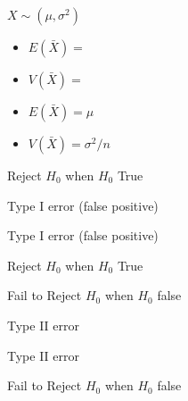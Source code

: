 \documentclass[12pt]{article}
\begin{document}
\begin{note}
    \begin{field}
        $X \sim (\mu,\sigma^2)$
            \begin{itemize}
              \item $E(\bar{X}) = $
              \item $V(\bar{X}) = $
            \end{itemize}
    \end{field}
    \begin{field}
        \begin{itemize}
              \item $E(\bar{X}) = \mu$
              \item $V(\bar{X}) = \sigma^2/n$
            \end{itemize}
    \end{field}
\end{note}

\begin{note}
    \begin{field}
        Reject $H_0$ when $H_0$ True
    \end{field}
    \begin{field}
        Type I error (false positive)
    \end{field}
\end{note}

\begin{note}
    \begin{field}
        Type I error (false positive)
    \end{field}
    \begin{field}
        Reject $H_0$ when $H_0$ True
    \end{field}
\end{note}

\begin{note}
    \begin{field}
        Fail to Reject $H_0$ when $H_0$ false
    \end{field}
    \begin{field}
        Type II error
    \end{field}
\end{note}

\begin{note}
    \begin{field}
        Type II error
    \end{field}
    \begin{field}
        Fail to Reject $H_0$ when $H_0$ false
    \end{field}
\end{note}
\end{document}
